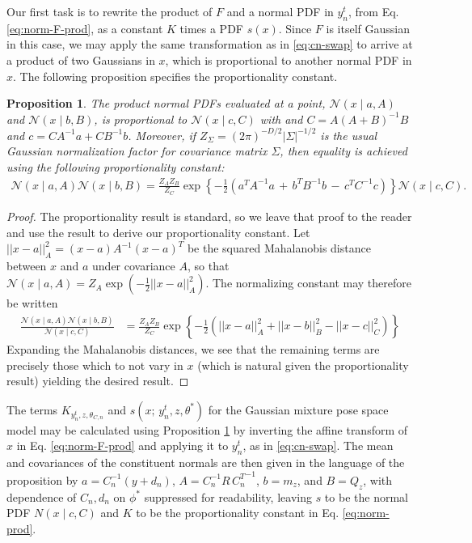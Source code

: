 \documentclass{article}         %
\newtheorem{proposition}{Proposition}[section]
\newcommand{\inv}{^{-1}}
\newcommand{\NN}{\mathcal{N}}
\newcommand{\abs}[1]{\left| #1 \right|}
\newcommand{\norm}[1]{\left|\left| #1 \right|\right|}
\newcommand{\cb}[1]{\left\{ #1 \right\}}
\newcommand{\pn}[1]{\left( #1 \right)}
\begin{document}
Our first task is to rewrite the product of $F$ and a normal PDF in $y_n^t$, from Eq. \ref{eq:norm-F-prod}, as a constant $K$ times a PDF $s(x)$. Since $F$ is itself Gaussian in this case, we may apply the same transformation as in \ref{eq:cn-swap} to arrive at a product of two Gaussians in $x$, which is proportional to another normal PDF in $x$. The following proposition specifies the proportionality constant.
\begin{proposition}
    The product normal PDFs evaluated at a point, $\NN(x\mid a, A)$ and $\NN(x\mid b, B)$, is proportional to $ \NN(x\mid c, C)$ with and $C = A\pn{A + B}\inv B$ and $c = CA\inv a + CB\inv b$. Moreover, if $Z_\Sigma = \pn{2\pi}^{-D/2}\abs{\Sigma}^{-1/2}$ is the usual Gaussian normalization factor for covariance matrix $\Sigma$, then equality is achieved using the following proportionality constant:
    \begin{align}
        \NN(x\mid a, A) \NN(x\mid b, B) = \frac{Z_AZ_B}{Z_C} \exp\cb{-\frac{1}{2}\pn{a^TA\inv a \,+\, b^TB\inv b \,-\, c^T C\inv c}} \NN(x\mid c, C).
        \label{eq:norm-prod}
    \end{align}
    \label{thm:norm-prod}
\end{proposition}
\begin{proof}
The proportionality result is standard, so we leave that proof to the reader and use the result to derive our proportionality constant. Let $\norm{x-a}^2_A = (x - a)A\inv (x - a)^T$ be the squared Mahalanobis distance between $x$ and $a$ under covariance $A$, so that $\NN(x\mid a, A) = Z_{A}\exp(-\frac{1}{2}\norm{x-a}^2_A)$. The normalizing constant may therefore be written
\begin{align}
    \frac{\NN(x\mid a, A)\NN(x\mid b, B)}{\NN(x\mid c, C)} &= \frac{Z_AZ_B}{Z_C} \exp\cb{-\frac{1}{2}\pn{\norm{x - a}^2_A + \norm{x - b}^2_B - \norm{x - c}^2_C}}
\end{align}
Expanding the Mahalanobis distances, we see that the remaining terms are precisely those which to not vary in $x$ (which is natural given the proportionality result) yielding the desired result.
\end{proof}


The terms $K_{y^t_n, z, \theta_{C, n}}$ and $s(x;\, y^t_n, z, \theta^*)$ for the Gaussian mixture pose space model may be calculated using Proposition \ref{thm:norm-prod} by inverting the affine transform of $x$ in Eq. \ref{eq:norm-F-prod} and applying it to $y_n^t$, as in \ref{eq:cn-swap}. The mean and covariances of the constituent normals are then given in the language of the proposition by $a = C_n\inv (y + d_n)$, $A = C_n\inv R\, {C_n^T}\inv$, $b = m_z$, and $B = Q_z$, with dependence of $C_n, d_n$ on $\phi^*$ suppressed for readability, leaving $s$ to be the normal PDF $N(x\mid c, C)$ and $K$ to be the proportionality constant in Eq. \ref{eq:norm-prod}.
\end{document}
